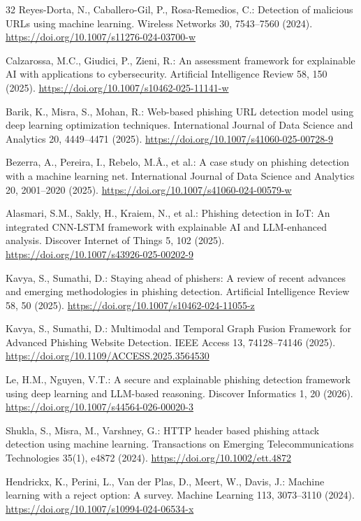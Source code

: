 \documentclass[conference]{IEEEtran}
\begin{document}
\begin{thebibliography}{32}
Reyes-Dorta, N., Caballero-Gil, P., Rosa-Remedios, C.: Detection of malicious URLs using machine learning. Wireless Networks 30, 7543--7560 (2024). \url{https://doi.org/10.1007/s11276-024-03700-w}

Calzarossa, M.C., Giudici, P., Zieni, R.: An assessment framework for explainable AI with applications to cybersecurity. Artificial Intelligence Review 58, 150 (2025). \url{https://doi.org/10.1007/s10462-025-11141-w}

Barik, K., Misra, S., Mohan, R.: Web-based phishing URL detection model using deep learning optimization techniques. International Journal of Data Science and Analytics 20, 4449--4471 (2025). \url{https://doi.org/10.1007/s41060-025-00728-9}

Bezerra, A., Pereira, I., Rebelo, M.{\^A}., et al.: A case study on phishing detection with a machine learning net. International Journal of Data Science and Analytics 20, 2001--2020 (2025). \url{https://doi.org/10.1007/s41060-024-00579-w}

Alasmari, S.M., Sakly, H., Kraiem, N., et al.: Phishing detection in IoT: An integrated CNN-LSTM framework with explainable AI and LLM-enhanced analysis. Discover Internet of Things 5, 102 (2025). \url{https://doi.org/10.1007/s43926-025-00202-9}

Kavya, S., Sumathi, D.: Staying ahead of phishers: A review of recent advances and emerging methodologies in phishing detection. Artificial Intelligence Review 58, 50 (2025). \url{https://doi.org/10.1007/s10462-024-11055-z}

Kavya, S., Sumathi, D.: Multimodal and Temporal Graph Fusion Framework for Advanced Phishing Website Detection. IEEE Access 13, 74128--74146 (2025). \url{https://doi.org/10.1109/ACCESS.2025.3564530}

Le, H.M., Nguyen, V.T.: A secure and explainable phishing detection framework using deep learning and LLM-based reasoning. Discover Informatics 1, 20 (2026). \url{https://doi.org/10.1007/s44564-026-00020-3}

Shukla, S., Misra, M., Varshney, G.: HTTP header based phishing attack detection using machine learning. Transactions on Emerging Telecommunications Technologies 35(1), e4872 (2024). \url{https://doi.org/10.1002/ett.4872}

Hendrickx, K., Perini, L., Van der Plas, D., Meert, W., Davis, J.: Machine learning with a reject option: A survey. Machine Learning 113, 3073--3110 (2024). \url{https://doi.org/10.1007/s10994-024-06534-x}


\end{thebibliography}
\end{document}
